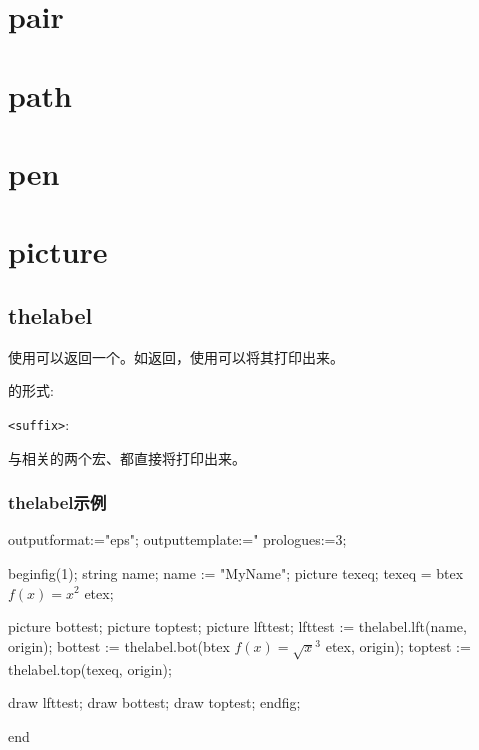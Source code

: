 
\section{pair}
\label{sec:pair}


\section{path}
\label{sec:path}


\section{pen}
\label{sec:pen}


\section{picture}

\subsection{thelabel}

使用可以返回一个。如返回，使用可以将其打印出来。

的形式:\newline
\indent {}\par

\noindent\lstinline$<suffix>$:

与相关的两个宏、都直接将打印出来。

\subsubsection{thelabel示例}

\begin{mpostcode}
outputformat:="eps";
outputtemplate:="%
prologues:=3;

beginfig(1);
    string name;
    name := "MyName";
    picture texeq;
    texeq = btex $f(x) = x^2$ etex;

    picture bottest;
    picture toptest;
    picture lfttest;
    lfttest := thelabel.lft(name, origin);
    bottest := thelabel.bot(btex $f(x) = {\sqrt{x}}^3$ etex, origin);
    toptest := thelabel.top(texeq, origin);

    draw lfttest;
    draw bottest;
    draw toptest;
endfig;

end
\end{mpostcode}

